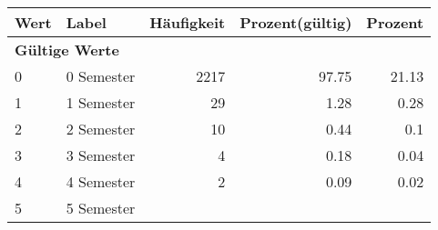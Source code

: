      \begin{longtable}{lXrrr}
     \toprule
     \textbf{Wert} & \textbf{Label} & \textbf{Häufigkeit} & \textbf{Prozent(gültig)} & \textbf{Prozent} \\
     \endhead
     \midrule
     \multicolumn{5}{l}{\textbf{Gültige Werte}}\\

     0 &
     \multicolumn{1}{X}{ 0 Semester   } &


       \num{2217} &
       \num[round-mode=places,round-precision=2]{97,75} &
         \num[round-mode=places,round-precision=2]{21,13} \\

     1 &
     \multicolumn{1}{X}{ 1 Semester   } &


       \num{29} &
       \num[round-mode=places,round-precision=2]{1,28} &
         \num[round-mode=places,round-precision=2]{0,28} \\

     2 &
     \multicolumn{1}{X}{ 2 Semester   } &


       \num{10} &
       \num[round-mode=places,round-precision=2]{0,44} &
         \num[round-mode=places,round-precision=2]{0,1} \\

     3 &
     \multicolumn{1}{X}{ 3 Semester   } &


       \num{4} &
       \num[round-mode=places,round-precision=2]{0,18} &
         \num[round-mode=places,round-precision=2]{0,04} \\

     4 &
     \multicolumn{1}{X}{ 4 Semester   } &


       \num{2} &
       \num[round-mode=places,round-precision=2]{0,09} &
         \num[round-mode=places,round-precision=2]{0,02} \\

     5 &
     \multicolumn{1}{X}{ 5 Semester   } &



\end{longtable}
